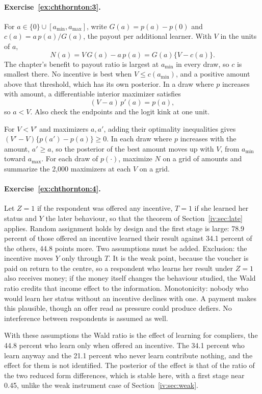 \paragraph{Exercise~\ref{ex:chthornton:3}.} For $a \in \{0\} \cup [a_{\min}, a_{\max}]$, write $G(a) = p(a) - p(0)$ and $c(a) = a\,p(a)/G(a)$, the payout per additional learner. With $V$ in the units of $a$,
\[
N(a) = V\,G(a) - a\,p(a) = G(a)\{V - c(a)\}.
\]
The chapter's benefit to payout ratio is largest at $a_{\min}$ in every draw, so $c$ is smallest there. No incentive is best when $V \le c(a_{\min})$, and a positive amount above that threshold, which has its own posterior. In a draw where $p$ increases with amount, a differentiable interior maximizer satisfies
\[
(V - a)\,p'(a) = p(a),
\]
so $a < V$. Also check the endpoints and the logit kink at one unit.

For $V < V'$ and maximizers $a,a'$, adding their optimality inequalities gives $(V' - V)\{p(a') - p(a)\} \ge 0$. In each draw where $p$ increases with the amount, $a' \ge a$, so the posterior of the best amount moves up with $V$, from $a_{\min}$ toward $a_{\max}$. For each draw of $p(\cdot)$, maximize $N$ on a grid of amounts and summarize the 2,000 maximizers at each $V$ on a grid.

\paragraph{Exercise~\ref{ex:chthornton:4}.} Let $Z = 1$ if the respondent was offered any incentive, $T = 1$ if she learned her status and $Y$ the later behaviour, so that the theorem of Section~\ref{iv:sec:late} applies. Random assignment holds by design and the first stage is large: 78.9 percent of those offered an incentive learned their result against 34.1 percent of the others, 44.8 points more. Two assumptions must be added. Exclusion: the incentive moves $Y$ only through $T$. It is the weak point, because the voucher is paid on return to the centre, so a respondent who learns her result under $Z = 1$ also receives money; if the money itself changes the behaviour studied, the Wald ratio credits that income effect to the information. Monotonicity: nobody who would learn her status without an incentive declines with one. A payment makes this plausible, though an offer read as pressure could produce defiers. No interference between respondents is assumed as well.

With these assumptions the Wald ratio is the effect of learning for compliers, the 44.8 percent who learn only when offered an incentive. The 34.1 percent who learn anyway and the 21.1 percent who never learn contribute nothing, and the effect for them is not identified. The posterior of the effect is that of the ratio of the two reduced form differences, which is stable here, with a first stage near 0.45, unlike the weak instrument case of Section~\ref{iv:sec:weak}.

